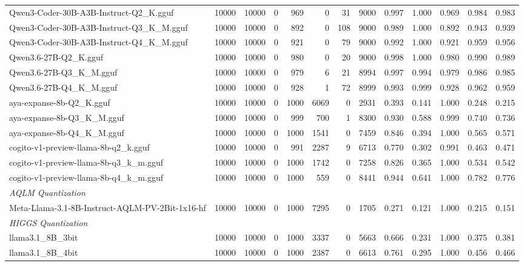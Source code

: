 \begin{table}[htbp]
{\begin{tabular}{lrrrrrrrrrrrr}
    Qwen3-Coder-30B-A3B-Instruct-Q2\_K.gguf & 10000 & 10000 & 0 & 969 & 0 & 31 & 9000 & 0.997 & 1.000 & 0.969 & 0.984 & 0.983 \\
    Qwen3-Coder-30B-A3B-Instruct-Q3\_K\_M.gguf & 10000 & 10000 & 0 & 892 & 0 & 108 & 9000 & 0.989 & 1.000 & 0.892 & 0.943 & 0.939 \\
    Qwen3-Coder-30B-A3B-Instruct-Q4\_K\_M.gguf & 10000 & 10000 & 0 & 921 & 0 & 79 & 9000 & 0.992 & 1.000 & 0.921 & 0.959 & 0.956 \\
    Qwen3.6-27B-Q2\_K.gguf & 10000 & 10000 & 0 & 980 & 0 & 20 & 9000 & 0.998 & 1.000 & 0.980 & 0.990 & 0.989 \\
    Qwen3.6-27B-Q3\_K\_M.gguf & 10000 & 10000 & 0 & 979 & 6 & 21 & 8994 & 0.997 & 0.994 & 0.979 & 0.986 & 0.985 \\
    Qwen3.6-27B-Q4\_K\_M.gguf & 10000 & 10000 & 0 & 928 & 1 & 72 & 8999 & 0.993 & 0.999 & 0.928 & 0.962 & 0.959 \\
    aya-expanse-8b-Q2\_K.gguf & 10000 & 10000 & 0 & 1000 & 6069 & 0 & 2931 & 0.393 & 0.141 & 1.000 & 0.248 & 0.215 \\
    aya-expanse-8b-Q3\_K\_M.gguf & 10000 & 10000 & 0 & 999 & 700 & 1 & 8300 & 0.930 & 0.588 & 0.999 & 0.740 & 0.736 \\
    aya-expanse-8b-Q4\_K\_M.gguf & 10000 & 10000 & 0 & 1000 & 1541 & 0 & 7459 & 0.846 & 0.394 & 1.000 & 0.565 & 0.571 \\
    cogito-v1-preview-llama-8b-q2\_k.gguf & 10000 & 10000 & 0 & 991 & 2287 & 9 & 6713 & 0.770 & 0.302 & 0.991 & 0.463 & 0.471 \\
    cogito-v1-preview-llama-8b-q3\_k\_m.gguf & 10000 & 10000 & 0 & 1000 & 1742 & 0 & 7258 & 0.826 & 0.365 & 1.000 & 0.534 & 0.542 \\
    cogito-v1-preview-llama-8b-q4\_k\_m.gguf & 10000 & 10000 & 0 & 1000 & 559 & 0 & 8441 & 0.944 & 0.641 & 1.000 & 0.782 & 0.776 \\
    \midrule
    \multicolumn{13}{l}{\textit{AQLM Quantization}} \\
    \midrule
    Meta-Llama-3.1-8B-Instruct-AQLM-PV-2Bit-1x16-hf & 10000 & 10000 & 0 & 1000 & 7295 & 0 & 1705 & 0.271 & 0.121 & 1.000 & 0.215 & 0.151 \\
    \midrule
    \multicolumn{13}{l}{\textit{HIGGS Quantization}} \\
    \midrule
    llama3.1\_8B\_3bit & 10000 & 10000 & 0 & 1000 & 3337 & 0 & 5663 & 0.666 & 0.231 & 1.000 & 0.375 & 0.381 \\
    llama3.1\_8B\_4bit & 10000 & 10000 & 0 & 1000 & 2387 & 0 & 6613 & 0.761 & 0.295 & 1.000 & 0.456 & 0.466 \\

\end{tabular}}
\end{table}
